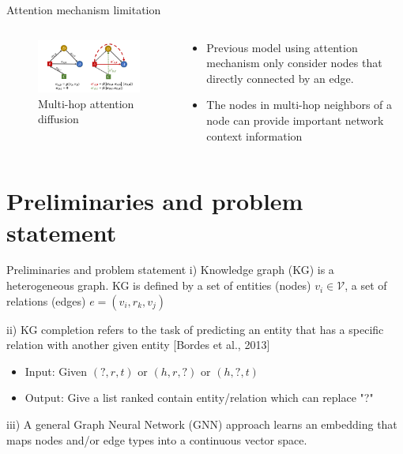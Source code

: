 \documentclass[notheorems, aspectratio=149]{beamer}
\begin{document}
		\begin{frame}{Attention mechanism limitation}
			\begin{columns}
				\begin{column}{0.5\textwidth}
					\begin{figure}[H]
						\centering
						\includegraphics[width=1\linewidth]{figs/multihop-diffusion.png}
						\caption{Multi-hop attention diffusion}
						\label{fig:writing-thesis}
					\end{figure}
				\end{column}
				\begin{column}{0.5\textwidth}  %
					\begin{itemize}
						\item Previous model using attention mechanism only consider nodes that directly connected by an edge. 
						\item The nodes in multi-hop neighbors of a node can provide important network context information
					\end{itemize}
				\end{column}
			\end{columns}
		\end{frame}
		\section{Preliminaries and problem statement}
		\begin{frame}{Preliminaries and problem statement}
			i) Knowledge graph (KG) is a heterogeneous graph. KG is
 defined by a set of entities (nodes) $v_i \in \mathcal{V}$, a set of relations (edges) $e = (v_i , r_k , v_j)$
			
			ii) KG completion refers to the task of predicting
 an entity that has a specific relation with another given entity [Bordes et al., 2013]
			\begin{itemize}
				\item Input: Given $(?, r, t)$ or $(h, r, ?)$ or $(h, ?, t)$
				\item Output: Give a list ranked contain entity/relation which can replace "?"
			\end{itemize}
		
			iii) A general Graph Neural Network (GNN) approach learns
an embedding that maps nodes and/or edge types into a continuous vector space.
		\end{frame}
\end{document}
